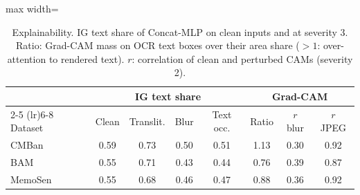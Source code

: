 \begin{table}[t]
\centering
\small
\caption{Explainability. IG text share of Concat-MLP on clean inputs and at severity 3. Ratio: Grad-CAM mass on OCR text boxes over their area share ($>1$: over-attention to rendered text). $r$: correlation of clean and perturbed CAMs (severity 2).}
\label{tab:conf_xai}
\begin{adjustbox}{max width=\columnwidth}
\begin{tabular}{lccccccc}
\toprule
 & \multicolumn{4}{c}{IG text share} & \multicolumn{3}{c}{Grad-CAM} \\
\cmidrule(lr){2-5} \cmidrule(lr){6-8}
Dataset & Clean & Translit. & Blur & Text occ. & Ratio & $r$ blur & $r$ JPEG \\
\midrule
CMBan & 0.59 & 0.73 & 0.50 & 0.51 & 1.13 & 0.30 & 0.92 \\
BAM & 0.55 & 0.71 & 0.43 & 0.44 & 0.76 & 0.39 & 0.87 \\
MemoSen & 0.55 & 0.68 & 0.46 & 0.47 & 0.88 & 0.36 & 0.92 \\
\bottomrule
\end{tabular}
\end{adjustbox}
\end{table}
